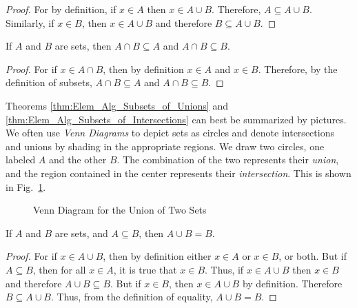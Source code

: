             \begin{proof}
                For by definition, if $x\in{A}$ then $x\in{A}\cup{B}$.
                Therefore, $A\subseteq{A}\cup{B}$. Similarly, if $x\in{B}$,
                then $x\in{A}\cup{B}$ and therefore $B\subseteq{A}\cup{B}$.
            \end{proof}
            \begin{theorem}
                \label{thm:Elem_Alg_Subsets_of_Intersections}
                If $A$ and $B$ are sets, then
                $A\cap{B}\subseteq{A}$ and
                $A\cap{B}\subseteq{B}$.
            \end{theorem}
            \begin{proof}
                For if $x\in{A}\cap{B}$, then by definition
                $x\in{A}$ and $x\in{B}$.
                Therefore, by the definition of subsets,
                ${A}\cap{B}\subseteq{A}$ and
                ${A}\cap{B}\subseteq{B}$.
            \end{proof}
            Theorems \ref{thm:Elem_Alg_Subsets_of_Unions}
            and \ref{thm:Elem_Alg_Subsets_of_Intersections}
            can best be summarized by pictures. We often use
            \textit{Venn Diagrams} to depict sets as circles
            and denote intersections and unions by shading
            in the appropriate regions. We draw two circles,
            one labeled $A$ and the other $B$. The combination
            of the two represents their \textit{union},
            and the region contained in the center
            represents their \textit{intersection}.
            This is shown in Fig.~\ref{fig:Elem_Alg_Venn_Diagram}.
            \begin{figure}[H]
                \captionsetup{type=figure}
                \centering
                
                \caption{Venn Diagram for the Union of Two Sets}
                \label{fig:Elem_Alg_Venn_Diagram}
            \end{figure}
            \begin{theorem}
                \label{thm:Elem_Alg_Union_of_Subset}
                If $A$ and $B$ are sets, and $A\subseteq{B}$,
                then $A\cup{B}=B$.
            \end{theorem}
            \begin{proof}
                For if $x\in{A\cup{B}}$, then by definition
                either $x\in{A}$ or $x\in{B}$, or both. But
                if $A\subseteq{B}$, then for all $x\in{A}$, it is
                true that $x\in{B}$. Thus, if $x\in{A}\cup{B}$
                then $x\in{B}$ and therefore
                $A\cup{B}\subseteq{B}$. But if $x\in{B}$, then
                $x\in{A}\cup{B}$ by definition. Therefore
                $B\subseteq{A}\cup{B}$. Thus, from the definition
                of equality, $A\cup{B}=B$.
            \end{proof}
